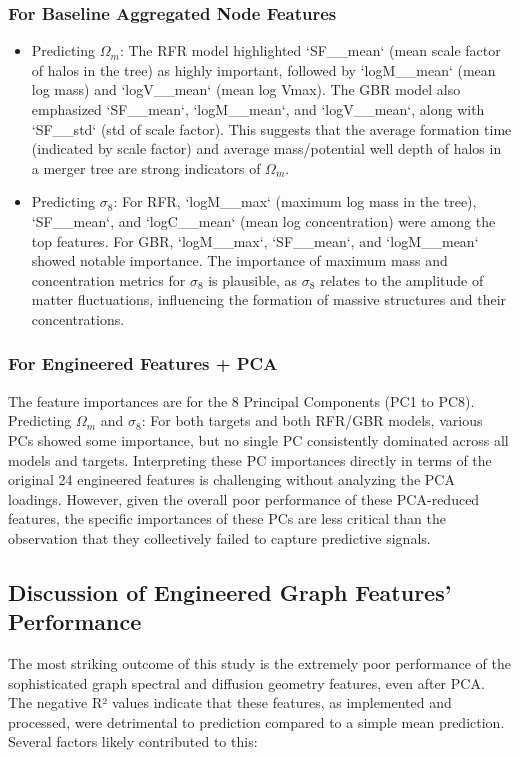\documentclass[twocolumn]{aastex631}
\begin{document}
\subsubsection{For Baseline Aggregated Node Features}
\begin{itemize}
    \item Predicting $\Omega_m$:
    The RFR model highlighted `SF\_\_mean` (mean scale factor of halos in the tree) as highly important, followed by `logM\_\_mean` (mean log mass) and `logV\_\_mean` (mean log Vmax). The GBR model also emphasized `SF\_\_mean`, `logM\_\_mean`, and `logV\_\_mean`, along with `SF\_\_std` (std of scale factor). This suggests that the average formation time (indicated by scale factor) and average mass/potential well depth of halos in a merger tree are strong indicators of $\Omega_m$.
    \item Predicting $\sigma_8$:
    For RFR, `logM\_\_max` (maximum log mass in the tree), `SF\_\_mean`, and `logC\_\_mean` (mean log concentration) were among the top features. For GBR, `logM\_\_max`, `SF\_\_mean`, and `logM\_\_mean` showed notable importance. The importance of maximum mass and concentration metrics for $\sigma_8$ is plausible, as $\sigma_8$ relates to the amplitude of matter fluctuations, influencing the formation of massive structures and their concentrations.
\end{itemize}

\subsubsection{For Engineered Features + PCA}
The feature importances are for the 8 Principal Components (PC1 to PC8). Predicting $\Omega_m$ and $\sigma_8$: For both targets and both RFR/GBR models, various PCs showed some importance, but no single PC consistently dominated across all models and targets. Interpreting these PC importances directly in terms of the original 24 engineered features is challenging without analyzing the PCA loadings. However, given the overall poor performance of these PCA-reduced features, the specific importances of these PCs are less critical than the observation that they collectively failed to capture predictive signals.

\subsection{Discussion of Engineered Graph Features' Performance}

The most striking outcome of this study is the extremely poor performance of the sophisticated graph spectral and diffusion geometry features, even after PCA. The negative R² values indicate that these features, as implemented and processed, were detrimental to prediction compared to a simple mean prediction. Several factors likely contributed to this:
\end{document}
